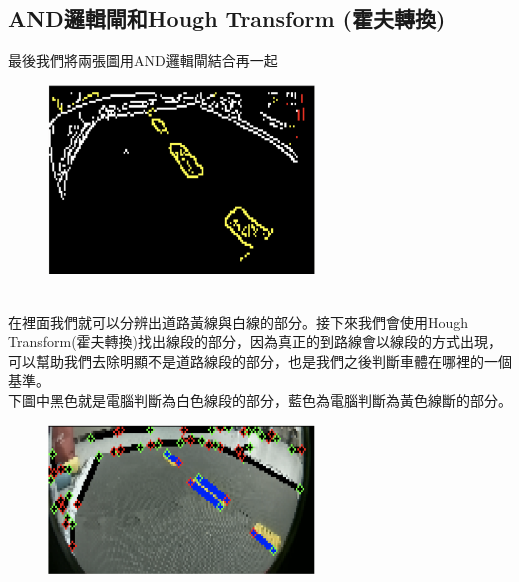 \documentclass{article}
\begin{document}
\subsection{AND邏輯閘和Hough Transform (霍夫轉換)}
最後我們將兩張圖用AND邏輯閘結合再一起
\begin{figure}[htp]
    \begin{center}
        \includegraphics[width=200pt]{pic/3_2_10.png}
    \end{center}
\end{figure}
\\
在裡面我們就可以分辨出道路黃線與白線的部分。接下來我們會使用Hough Transform(霍夫轉換)找出線段的部分，因為真正的到路線會以線段的方式出現，可以幫助我們去除明顯不是道路線段的部分，也是我們之後判斷車體在哪裡的一個基準。
\\下圖中黑色就是電腦判斷為白色線段的部分，藍色為電腦判斷為黃色線斷的部分。
\begin{figure}[htp]
    \begin{center}
        \includegraphics[width=200pt]{pic/3_2_11.png}
    \end{center}
\end{figure}
\\\\\\
\end{document}

